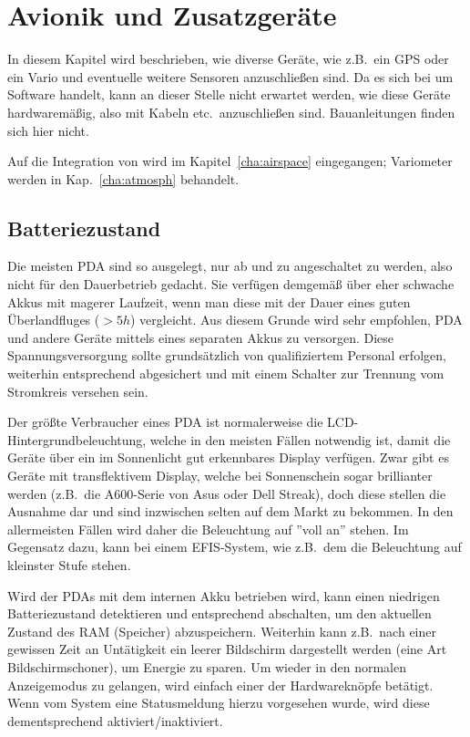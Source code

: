 \chapter{Avionik und Zusatzgeräte}\label{cha:avionics-airframe}

In diesem Kapitel wird beschrieben, wie diverse Geräte, wie z.B.\ ein GPS oder ein Vario und eventuelle weitere Sensoren anzuschließen sind. 
\warning  Da es sich bei \xc um Software handelt, kann an dieser Stelle nicht erwartet werden, wie diese Geräte hardwaremäßig, also mit Kabeln etc.\ anzuschließen sind. Bauanleitungen finden sich hier nicht.

Auf die Integration von \fl wird im Kapitel~\ref{cha:airspace}  eingegangen; Variometer werden in Kap.~\ref{cha:atmosph}  behandelt.
\section{Batteriezustand}

Die meisten \textsf{PDA} sind so ausgelegt, nur ab und zu angeschaltet zu werden, also nicht für den Dauerbetrieb gedacht. Sie verfügen demgemäß über eher schwache Akkus mit magerer Laufzeit, wenn man diese mit der Dauer eines guten Überlandfluges  ($>5h$) vergleicht. 
Aus diesem Grunde wird sehr empfohlen, \textsf{PDA} und andere Geräte mittels eines separaten Akkus zu versorgen. Diese Spannungsversorgung sollte grundsätzlich von qualifiziertem Personal erfolgen, weiterhin entsprechend abgesichert und mit einem Schalter zur Trennung vom Stromkreis versehen sein.

Der größte Verbraucher eines \textsf{PDA} ist normalerweise die LCD-Hintergrundbeleuchtung, welche in den meisten Fällen notwendig ist, damit die Geräte über ein im Sonnenlicht gut erkennbares Display verfügen. Zwar gibt es Geräte mit transflektivem Display, welche bei Sonnenschein sogar brillianter werden (z.B.\ die A600-Serie von Asus oder Dell Streak), doch diese stellen die Ausnahme dar und sind inzwischen selten auf dem Markt zu bekommen.  In den allermeisten Fällen wird daher die Beleuchtung auf ''voll an'' stehen. 
Im Gegensatz dazu, kann bei einem EFIS-System, wie z.B.\ dem \al die Beleuchtung auf kleinster Stufe stehen.


Wird der \textsf{PDA}s mit dem internen Akku betrieben wird, kann  \xc einen niedrigen Batteriezustand detektieren und entsprechend abschalten, um den aktuellen Zustand des RAM (Speicher) abzuspeichern. Weiterhin kann z.B.\ nach einer gewissen Zeit an Untätigkeit ein leerer Bildschirm  dargestellt werden (eine Art Bildschirmschoner), um Energie zu sparen.  
Um wieder in den normalen  Anzeigemodus zu gelangen, wird einfach einer der Hardwareknöpfe betätigt. Wenn vom System eine Statusmeldung hierzu vorgesehen wurde, wird diese dementsprechend aktiviert/inaktiviert.

